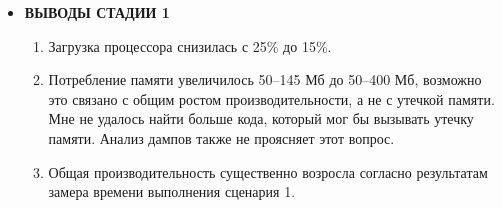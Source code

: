 \documentclass{article}
\begin{document}
\begin{itemize}
		\item \textbf{ВЫВОДЫ СТАДИИ 1}
		\begin{enumerate}
			\item Загрузка процессора снизилась с 25\% до 15\%.
			\item Потребление памяти увеличилось 50--145 Мб до 50--400 Мб, возможно это связано с общим ростом производительности, а не с утечкой памяти. Мне не удалось найти больше кода, который мог бы вызывать утечку памяти. 
			Анализ дампов также не проясняет этот вопрос.
			\item Общая производительность существенно возросла согласно результатам замера времени выполнения сценария 1.
		\end{enumerate}
	\end{itemize}
	
\end{document}
